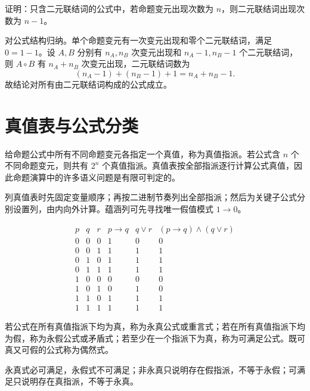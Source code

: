 \begin{example}[title={结构归纳证明}]\label{ch1-structural-induction}
证明：只含二元联结词的公式中，若命题变元出现次数为 $n$，则二元联结词出现次数为 $n-1$。
\begin{solution}
对公式结构归纳。单个命题变元有一次变元出现和零个二元联结词，满足 $0=1-1$。设 $A,B$ 分别有 $n_A,n_B$ 次变元出现和 $n_A-1,n_B-1$ 个二元联结词，则 $A\circ B$ 有 $n_A+n_B$ 次变元出现，二元联结词数为
\[
  (n_A-1)+(n_B-1)+1=n_A+n_B-1.
\]
故结论对所有由二元联结词构成的公式成立。
\end{solution}
\end{example}

\section{真值表与公式分类}

给命题公式中所有不同命题变元各指定一个真值，称为真值指派。若公式含 $n$ 个不同命题变元，则共有 $2^n$ 个真值指派。真值表按全部指派逐行计算公式真值，因此命题演算中的许多语义问题是有限可判定的。

\begin{method}[真值表构造]\label{ch1-truth-table-method}
列真值表时先固定变量顺序；再按二进制节奏列出全部指派；然后为关键子公式分别设置列，由内向外计算。蕴涵列可先寻找唯一假值模式 $1\to0$。
\end{method}

\[
\begin{array}{ccc|c|c|c}
p&q&r&p\to q&q\lor r&(p\to q)\land(q\lor r)\\ \hline
0&0&0&1&0&0\\
0&0&1&1&1&1\\
0&1&0&1&1&1\\
0&1&1&1&1&1\\
1&0&0&0&0&0\\
1&0&1&0&1&0\\
1&1&0&1&1&1\\
1&1&1&1&1&1
\end{array}
\]

\begin{definition}[永真、永假、可满足]\label{ch1-classification}
若公式在所有真值指派下均为真，称为永真公式或重言式；若在所有真值指派下均为假，称为永假公式或矛盾式；若至少在一个指派下为真，称为可满足公式。既可真又可假的公式称为偶然式。
\end{definition}

永真式必可满足，永假式不可满足；非永真只说明存在假指派，不等于永假；可满足只说明存在真指派，不等于永真。

